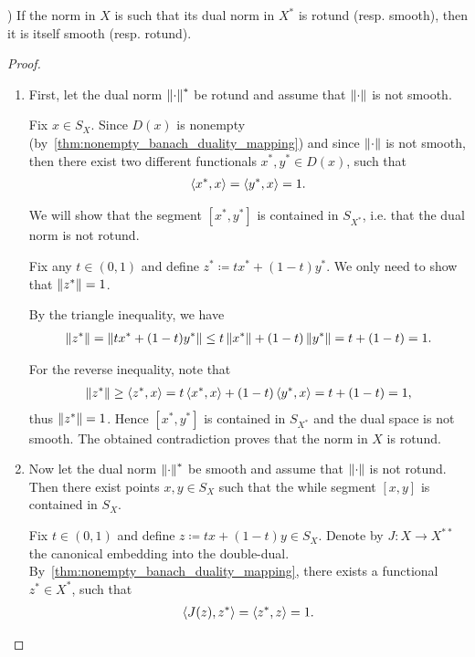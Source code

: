 \begin{theorem}\label{thm:smooth_rotund_norm_duality}\cite[exercise 2.37(a]{Phelps1993})
  If the norm in $X$ is such that its dual norm in $X^*$ is rotund (resp. smooth), then it is itself smooth (resp. rotund).
\end{theorem}
\begin{proof}
  \begin{enumerate}
    \item First, let the dual norm $\left\Vert \cdot \right\Vert^*$ be rotund and assume that $\left\Vert \cdot \right\Vert$ is not smooth.

    Fix $x \in S_X$. Since $D(x)$ is nonempty (by~\cref{thm:nonempty_banach_duality_mapping}) and since $\left\Vert \cdot \right\Vert$ is not smooth, then there exist two different functionals $x^*, y^* \in D(x)$, such that
    \begin{align*}
      \left\langle x^*, x \right\rangle
      =
      \left\langle y^*, x \right\rangle
      =
      1.
    \end{align*}

    We will show that the segment $[x^*, y^*]$ is contained in $S_{X^*}$, i.e. that the dual norm is not rotund.

    Fix any $t \in (0, 1)$ and define $z^* \coloneqq t x^* + (1-t) y^*$. We only need to show that $\left\Vert z^* \right\Vert = 1$.

    By the triangle inequality, we have
    \begin{align*}
      \left\Vert z^* \right\Vert
      =
      \left\Vert t x^* + (1-t) y^* \right\Vert
      \leq
      t \left\Vert x^* \right\Vert + (1-t) \left\Vert y^* \right\Vert
      =
      t + (1-t)
      =
      1.
    \end{align*}

    For the reverse inequality, note that
    \begin{align*}
      \left\Vert z^* \right\Vert
      \geq
      \left\langle z^*, x \right\rangle
      =
      t \left\langle x^*, x \right\rangle + (1-t) \left\langle y^*, x \right\rangle
      =
      t + (1-t)
      =
      1,
    \end{align*}
    thus $\left\Vert z^* \right\Vert = 1$. Hence $[x^*, y^*]$ is contained in $S_{X^*}$ and the dual space is not smooth. The obtained contradiction proves that the norm in $X$ is rotund.

    \item Now let the dual norm $\left\Vert \cdot \right\Vert^*$ be smooth and assume that $\left\Vert \cdot \right\Vert$ is not rotund. Then there exist points $x, y \in S_X$ such that the while segment $[x, y]$ is contained in $S_X$.

    Fix $t \in (0, 1)$ and define $z \coloneqq tx + (1-t)y \in S_X$. Denote by $J: X \to X^{**}$ the canonical embedding into the double-dual. By~\cref{thm:nonempty_banach_duality_mapping}, there exists a functional $z^* \in X^*$, such that
    \begin{align*}
      \left\langle J(z), z^* \right\rangle
      =
      \left\langle z^*, z \right\rangle
      =
      1.
    \end{align*}


\end{enumerate}
\end{proof}
